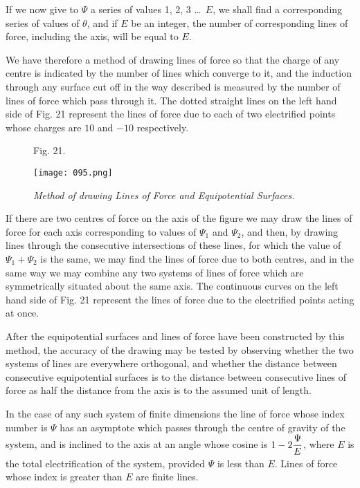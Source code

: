 \documentclass[12pt,oneside]{book}[2021/10/04]
\newcommand{\xp}{\rule[-2.0ex]{0pt}{5.2ex}}
\newcommand{\¬}{\hphantom{0}}
\begin{document}
If we now give to \(\Psi\) a series of values 1, 2, 3 \ldots\ \(E\), we shall find
a corresponding series of values of \(\theta\), and if \(E\) be an integer, the
number of corresponding lines of force, including the axis, will be
equal to \(E\).

We have therefore a method of drawing lines of force so that
the charge of any centre is indicated by the number of lines which
converge to it, and the induction through any surface cut off in the
way described is measured by the number of lines of force which
pass through it. The dotted straight lines on the left hand side
of Fig. 21 represent the lines of force due to each of two electrified
points whose charges are \(10\) and \(-10\) respectively.

\begin{figure}[htp!]
\centering
\caption*{Fig. 21.}
\texttt{[image: 095.png]}
\caption*{\textit{Method of drawing
Lines of Force and Equipotential Surfaces.}}
\end{figure}

If there are two centres of force on the axis of the figure we
may draw the lines of force for each axis corresponding to values
of \(\Psi_1\) and \(\Psi_2\), and then, by drawing lines through the consecutive
intersections of these lines, for which the value of \(\Psi_1 + \Psi_2\) is the
same, we may find the lines of force due to both centres, and in
the same way we may combine any two systems of lines of force
which are symmetrically situated about the same axis. The continuous
curves on the left hand side of Fig. 21 represent the lines
of force due to the electrified points acting at once.

After the equipotential surfaces and lines of force have been
constructed by this method, the accuracy of the drawing may be
tested by observing whether the two systems of lines are everywhere
orthogonal, and whether the distance between consecutive
equipotential surfaces is to the distance between consecutive lines
of force as half the distance from the axis is to the assumed unit of
length.

In the case of any such system of finite dimensions the line of
force whose index number is \(\Psi\) has an asymptote which passes
through the centre of gravity of the system, and is inclined to the
axis at an angle whose cosine is \(1 - 2 \xp\dfrac{\Psi}{E}\), where \(E\) is the total
electrification of the system, provided \(\Psi\) is less than \(E\). Lines of
force whose index is greater than \(E\) are finite lines.
\end{document}
